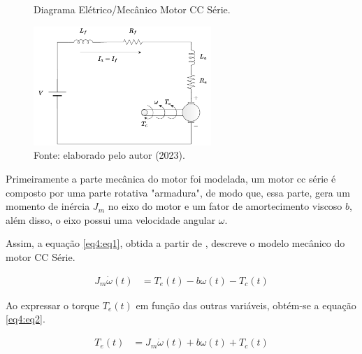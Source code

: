 \begin{figure}[!h]
	\centering
	\caption{Diagrama Elétrico/Mecânico Motor CC Série.}
	\includegraphics[width=0.6\textwidth]{Capitulos/2_aeropendulo/4_figuras/diagrama_motor_cc.pdf}
	\caption*{Fonte: elaborado pelo autor (2023).}
	\label{fig4:image_03}
\end{figure}




Primeiramente a parte mecânica do motor foi modelada, um motor cc série é composto por uma parte rotativa "armadura", de modo que, essa parte, gera um momento de inércia $J_m$ no eixo do motor e um fator de amortecimento viscoso $b$, além disso, o eixo possui uma velocidade angular $\omega$.

Assim, a equação \ref{eq4:eq1}, obtida a partir de \cite{jesus}, descreve o modelo mecânico do motor CC Série.

\begin{align}
	J_m\dot{\omega}(t) &= T_e(t) - b\omega(t) - T_c(t) \label{eq4:eq1}
\end{align}


Ao expressar o torque $T_e(t)$ em função das outras variáveis, obtém-se a equação \ref{eq4:eq2}.

\begin{align}
	T_e(t) &= J_m\dot{\omega}(t) + b\omega(t) + T_c(t) \label{eq4:eq2}
\end{align}


